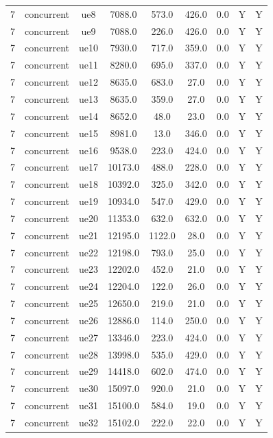\begin{table}[ht]
\begin{tabular}{|c|c|c|c|c|c|c|c|c|}
7 & concurrent & ue8 & 7088.0 & 573.0 & 426.0 & 0.0 & Y & Y \\
7 & concurrent & ue9 & 7088.0 & 226.0 & 426.0 & 0.0 & Y & Y \\
7 & concurrent & ue10 & 7930.0 & 717.0 & 359.0 & 0.0 & Y & Y \\
7 & concurrent & ue11 & 8280.0 & 695.0 & 337.0 & 0.0 & Y & Y \\
7 & concurrent & ue12 & 8635.0 & 683.0 & 27.0 & 0.0 & Y & Y \\
7 & concurrent & ue13 & 8635.0 & 359.0 & 27.0 & 0.0 & Y & Y \\
7 & concurrent & ue14 & 8652.0 & 48.0 & 23.0 & 0.0 & Y & Y \\
7 & concurrent & ue15 & 8981.0 & 13.0 & 346.0 & 0.0 & Y & Y \\
7 & concurrent & ue16 & 9538.0 & 223.0 & 424.0 & 0.0 & Y & Y \\
7 & concurrent & ue17 & 10173.0 & 488.0 & 228.0 & 0.0 & Y & Y \\
7 & concurrent & ue18 & 10392.0 & 325.0 & 342.0 & 0.0 & Y & Y \\
7 & concurrent & ue19 & 10934.0 & 547.0 & 429.0 & 0.0 & Y & Y \\
7 & concurrent & ue20 & 11353.0 & 632.0 & 632.0 & 0.0 & Y & Y \\
7 & concurrent & ue21 & 12195.0 & 1122.0 & 28.0 & 0.0 & Y & Y \\
7 & concurrent & ue22 & 12198.0 & 793.0 & 25.0 & 0.0 & Y & Y \\
7 & concurrent & ue23 & 12202.0 & 452.0 & 21.0 & 0.0 & Y & Y \\
7 & concurrent & ue24 & 12204.0 & 122.0 & 26.0 & 0.0 & Y & Y \\
7 & concurrent & ue25 & 12650.0 & 219.0 & 21.0 & 0.0 & Y & Y \\
7 & concurrent & ue26 & 12886.0 & 114.0 & 250.0 & 0.0 & Y & Y \\
7 & concurrent & ue27 & 13346.0 & 223.0 & 424.0 & 0.0 & Y & Y \\
7 & concurrent & ue28 & 13998.0 & 535.0 & 429.0 & 0.0 & Y & Y \\
7 & concurrent & ue29 & 14418.0 & 602.0 & 474.0 & 0.0 & Y & Y \\
7 & concurrent & ue30 & 15097.0 & 920.0 & 21.0 & 0.0 & Y & Y \\
7 & concurrent & ue31 & 15100.0 & 584.0 & 19.0 & 0.0 & Y & Y \\
7 & concurrent & ue32 & 15102.0 & 222.0 & 22.0 & 0.0 & Y & Y \\

\end{tabular}
\end{table}
